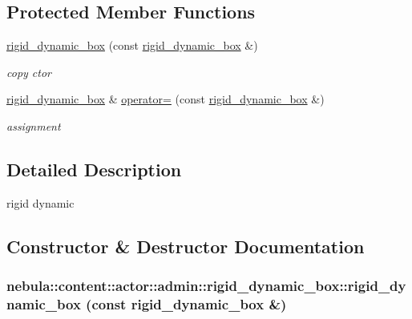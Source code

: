 \subsection*{Protected Member Functions}
\begin{DoxyCompactItemize}
\item 
\hyperlink{classnebula_1_1content_1_1actor_1_1admin_1_1rigid__dynamic__box_a93de41b4f7be189eef40cb2e57677c69}{rigid\_\-dynamic\_\-box} (const \hyperlink{classnebula_1_1content_1_1actor_1_1admin_1_1rigid__dynamic__box}{rigid\_\-dynamic\_\-box} \&)
\begin{DoxyCompactList}\small\item\em copy ctor \item\end{DoxyCompactList}\item 
\hyperlink{classnebula_1_1content_1_1actor_1_1admin_1_1rigid__dynamic__box}{rigid\_\-dynamic\_\-box} \& \hyperlink{classnebula_1_1content_1_1actor_1_1admin_1_1rigid__dynamic__box_aeed451b7d00e75948f474e4bb20404ba}{operator=} (const \hyperlink{classnebula_1_1content_1_1actor_1_1admin_1_1rigid__dynamic__box}{rigid\_\-dynamic\_\-box} \&)
\begin{DoxyCompactList}\small\item\em assignment \item\end{DoxyCompactList}\end{DoxyCompactItemize}


\subsection{Detailed Description}
rigid dynamic 

\subsection{Constructor \& Destructor Documentation}
\hypertarget{classnebula_1_1content_1_1actor_1_1admin_1_1rigid__dynamic__box_a93de41b4f7be189eef40cb2e57677c69}{
\subsubsection[{rigid\_\-dynamic\_\-box}]{\setlength{\rightskip}{0pt plus 5cm}nebula::content::actor::admin::rigid\_\-dynamic\_\-box::rigid\_\-dynamic\_\-box (const {\bf rigid\_\-dynamic\_\-box} \&)}}
\label{classnebula_1_1content_1_1actor_1_1admin_1_1rigid__dynamic__box_a93de41b4f7be189eef40cb2e57677c69}


